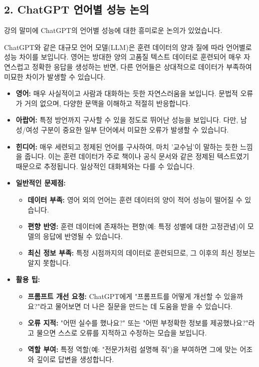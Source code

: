 \documentclass[11pt,a4paper]{article}
\theoremstyle{definition}
\begin{document}
\subsection{2. ChatGPT 언어별 성능 논의}
강의 말미에 ChatGPT의 언어별 성능에 대한 흥미로운 논의가 있었습니다.

\begin{tcolorbox}[infobox, title=💡 ChatGPT 언어별 성능 및 특징]
ChatGPT와 같은 대규모 언어 모델(LLM)은 훈련 데이터의 양과 질에 따라 언어별로 성능 차이를 보입니다.
영어는 방대한 양의 고품질 텍스트 데이터로 훈련되어 매우 자연스럽고 정확한 응답을 생성하는 반면, 다른 언어들은 상대적으로 데이터가 부족하여 미묘한 차이가 발생할 수 있습니다.
\end{tcolorbox}

\begin{itemize}
    \item \textbf{영어:} 매우 사실적이고 사람과 대화하는 듯한 자연스러움을 보입니다. 문법적 오류가 거의 없으며, 다양한 문맥을 이해하고 적절히 반응합니다.
    \item \textbf{아랍어:} 특정 방언까지 구사할 수 있을 정도로 뛰어난 성능을 보입니다. 다만, 남성/여성 구분이 중요한 일부 단어에서 미묘한 오류가 발생할 수 있습니다.
    \item \textbf{힌디어:} 매우 세련되고 정제된 언어를 구사하여, 마치 '교수님'이 말하는 듯한 느낌을 줍니다. 이는 훈련 데이터가 주로 책이나 공식 문서와 같은 정제된 텍스트였기 때문으로 추정됩니다. 일상적인 대화체와는 다를 수 있습니다.
    \item \textbf{일반적인 문제점:}
        \begin{itemize}
            \item \textbf{데이터 부족:} 영어 외의 언어는 훈련 데이터의 양이 적어 성능이 떨어질 수 있습니다.
            \item \textbf{편향 반영:} 훈련 데이터에 존재하는 편향(예: 특정 성별에 대한 고정관념)이 모델의 응답에 반영될 수 있습니다.
            \item \textbf{최신 정보 부족:} 특정 시점까지의 데이터로 훈련되므로, 그 이후의 최신 정보는 알지 못합니다.
        \end{itemize}
    \item \textbf{활용 팁:}
        \begin{itemize}
            \item \textbf{프롬프트 개선 요청:} ChatGPT에게 "프롬프트를 어떻게 개선할 수 있을까요?"라고 물어보면 더 나은 질문을 만드는 데 도움을 받을 수 있습니다.
            \item \textbf{오류 지적:} "어떤 실수를 했나요?" 또는 "어떤 부정확한 정보를 제공했나요?"라고 물으면 스스로 오류를 지적하고 수정하는 모습을 보입니다.
            \item \textbf{역할 부여:} 특정 역할(예: "전문가처럼 설명해 줘")을 부여하면 그에 맞는 어조와 깊이로 답변을 생성합니다.
        \end{itemize}
\end{itemize}
\end{document}
